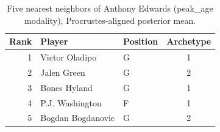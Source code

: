 \begin{table}[htbp]
  \centering\small
  \begin{tabular}{rllc}
    \toprule
    Rank & Player & Position & Archetype \\
    \midrule
    1 & Victor Oladipo & G & 1 \\
    2 & Jalen Green & G & 2 \\
    3 & Bones Hyland & G & 1 \\
    4 & P.J. Washington & F & 1 \\
    5 & Bogdan Bogdanovic & G & 2 \\
    \bottomrule
  \end{tabular}
  \caption{Five nearest neighbors of Anthony Edwards (peak_age modality), Procrustes-aligned posterior mean.}
  \label{tab:Anthony_Edwards_neighbors_peak_age}
\end{table}

